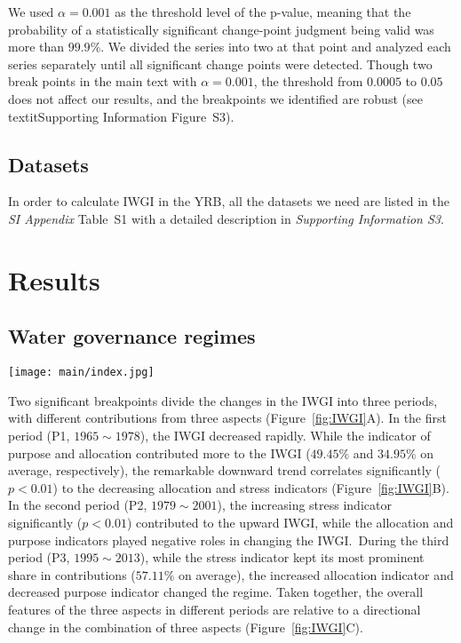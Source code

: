 \documentclass[draft]{agujournal2019}
\begin{document}
We used $\alpha = 0.001$ as the threshold level of the p-value, meaning that the probability of a statistically significant change-point judgment being valid was more than $99.9\%$. We divided the series into two at that point and analyzed each series separately until all significant change points were detected. Though two break points in the main text with $\alpha = 0.001$, the threshold from $0.0005$ to $0.05$ does not affect our results, and the breakpoints we identified are robust (see \\textit{Supporting Information} Figure~S3).

	\subsection{Datasets}
In order to calculate IWGI in the YRB, all the datasets we need are listed in the \textit{SI Appendix} Table~S1 with a detailed description in \textit{Supporting Information S3}.
 \section{Results}\label{sec2}
\subsection{Water governance regimes}\label{Res.1}

\begin{figure*}[ht!]
	\centering
	\texttt{[image: main/index.jpg]}
	\caption{Changes in the IWGI index and corresponding water governance regimes: P1: $1965 \sim 1978$, P2: $1979 \sim 2001$, and P3: $2002 \sim 2013$.
	\textbf{A,} detecting change points of IWGI and contributions from each indicator. Two significant change points ($p<0.01$) occurred in 1978 and 2001.
	\textbf{B,} correlation of trends between the IWGI and the indicators.
	\textbf{C,} across three indicators, changing components of the IWGI, whose directions shifts between different regimes.
	}\label{fig:IWGI}
\end{figure*}

Two significant breakpoints divide the changes in the IWGI into three periods, with different contributions from three aspects (Figure~\ref{fig:IWGI}A).
In the first period (P1, $1965 \sim 1978$), the IWGI decreased rapidly.
While the indicator of purpose and allocation contributed more to the IWGI ($49.45\%$ and $34.95\%$ on average, respectively), the remarkable downward trend correlates significantly ($p<0.01$) to the decreasing allocation and stress indicators (Figure~\ref{fig:IWGI}B).
In the second period (P2, $1979 \sim 2001$), the increasing stress indicator significantly ($p<0.01$) contributed to the upward IWGI, while the allocation and purpose indicators played negative roles in changing the IWGI.\
During the third period (P3, $1995 \sim 2013$), while the stress indicator kept its most prominent share in contributions ($57.11\%$ on average), the increased allocation indicator and decreased purpose indicator changed the regime.
Taken together, the overall features of the three aspects in different periods are relative to a directional change in the combination of three aspects (Figure~\ref{fig:IWGI}C).
\end{document}
